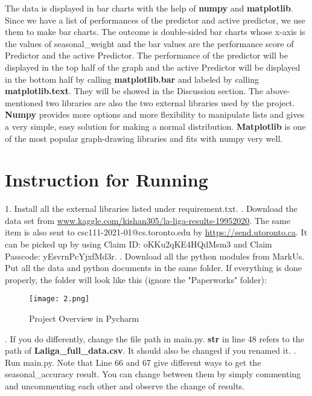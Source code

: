 \documentclass[fontsize=11pt]{article}
\begin{document}
\newline
\newline
The data is displayed in bar charts with the help of \textbf{numpy} and \textbf{matplotlib}. Since we have a list of performances of the predictor and active predictor, we use them to make bar charts. The outcome is double-sided bar charts whose x-axis is the values of seasonal\_weight and the bar values are the performance score of Predictor and the active Predictor. The performance of the predictor will be displayed in the top half of the graph and the active Predictor will be displayed in the bottom half by calling \textbf{matplotlib.bar} and labeled by calling \textbf{matplotlib.text}. They will be showed in the Discussion section. The above-mentioned two libraries are also the two external libraries used by the project. \textbf{Numpy} provides more options and more flexibility to manipulate lists and gives a very simple, easy solution for making a normal distribution. \textbf{Matplotlib} is one of the most popular graph-drawing libraries and fits with numpy very well.

\section*{Instruction for Running}

1. Install all the external libraries listed under requirement.txt.
\newline
{}. Download the data set from \url{www.kaggle.com/kishan305/la-liga-results-19952020}. The same item is also sent to csc111-2021-01@cs.toronto.edu by \url{https://send.utoronto.ca}. It can be picked up by using Claim ID: oKKu2qKE4HQdMsm3 and Claim Passcode: yEsvrnPcYjxfMd3r. 
\newline
{}. Download all the python modules from MarkUs. Put all the data and python documents in the same folder. If everything is done properly, the folder will look like this (ignore the "Paperworks" folder):
\begin{figure}[h]
    \centering
    \texttt{[image: 2.png]}
    \caption{Project Overview in Pycharm}
    \label{fig:3}
\end{figure}
. If you do differently, change the file path in main.py. \textbf{str} in line 48 refers to the path of \textbf{Laliga\_full\_data.csv}. It should also be changed if you renamed it.
\newline
{}. Run main.py. Note that Line 66 and 67 give different ways to get the seasonal\_accuracy result. You can change between them by simply commenting and uncommenting each other and observe the change of results.
\end{document}
